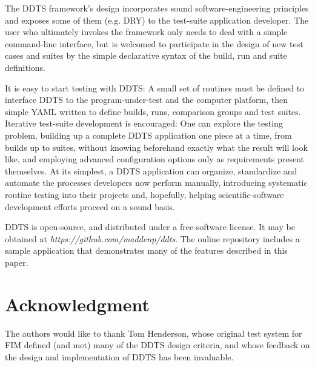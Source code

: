 \documentclass[conference]{IEEEtran}
\begin{document}
The DDTS framework's design incorporates sound software-engineering principles and exposes some of them (e.g. DRY) to the test-suite application developer. The user who ultimately invokes the framework only needs to deal with a simple command-line interface, but is welcomed to participate in the design of new test cases and suites by the simple declarative syntax of the build, run and suite definitions.

It is easy to start testing with DDTS: A small set of routines must be defined to interface DDTS to the program-under-test and the computer platform, then simple YAML written to define builds, runs, comparison groups and test suites. Iterative test-suite development is encouraged: One can explore the testing problem, building up a complete DDTS application one piece at a time, from builds up to suites, without knowing beforehand exactly what the result will look like, and employing advanced configuration options only as requirements present themselves. At its simplest, a DDTS application can organize, standardize and automate the processes developers now perform manually, introducing systematic routine testing into their projects and, hopefully, helping scientific-software development efforts proceed on a sound basis.

DDTS is open-source, and distributed under a free-software license. It may be obtained at \emph{https://github.com/maddenp/ddts}. The online repository includes a sample application that demonstrates many of the features described in this paper.

\section*{Acknowledgment}

The authors would like to thank Tom Henderson, whose original test system for FIM defined (and met) many of the DDTS design criteria, and whose feedback on the design and implementation of DDTS has been invaluable.
\end{document}
